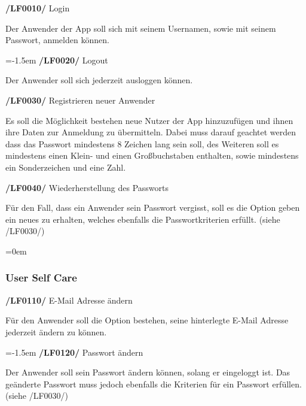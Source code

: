 \documentclass[11pt,a4paper]{report}
\begin{document}
\textbf{/LF0010/} Login
\par
\begingroup
\leftskip=1cm
\noindent Der Anwender der App soll sich mit seinem Usernamen, sowie mit seinem Passwort, anmelden können.\\
\par
\endgroup

\leftskip=-1.5em
\textbf{/LF0020/} Logout
\par
\begingroup
\leftskip=1cm
\noindent Der Anwender soll sich jederzeit ausloggen können.\\
\par
\endgroup

\textbf{/LF0030/} Registrieren neuer Anwender
\par
\begingroup
\leftskip=1cm
\noindent Es soll die Möglichkeit bestehen neue Nutzer der App hinzuzufügen und ihnen ihre Daten zur Anmeldung zu übermitteln. 
Dabei muss darauf geachtet werden dass das Passwort mindestens 8 Zeichen lang sein soll, des Weiteren soll es mindestens einen Klein- und einen Großbuchstaben enthalten, sowie mindestens ein Sonderzeichen und eine Zahl.\\
\par
\endgroup

\textbf{/LF0040/} Wiederherstellung des Passworts
\par
\begingroup
\leftskip=1cm
\noindent Für den Fall, dass ein Anwender sein Passwort vergisst, soll es die Option geben ein neues zu erhalten, welches ebenfalls die Passwortkriterien erfüllt. 
(siehe /LF0030/)\\
\par
\endgroup

\leftskip=0em
\subsubsection{User Self Care}

\textbf{/LF0110/} E-Mail Adresse ändern
\par
\begingroup
\leftskip=1cm
\noindent Für den Anwender soll die Option bestehen, seine hinterlegte E-Mail Adresse jederzeit ändern zu können.\\
\par
\endgroup

\leftskip=-1.5em
\textbf{/LF0120/} Passwort ändern
\par
\begingroup
\leftskip=1cm
\noindent Der Anwender soll sein Passwort ändern können, solang er eingeloggt ist. 
Das geänderte Passwort muss jedoch ebenfalls die Kriterien für ein Passwort erfüllen. 
(siehe /LF0030/)\\
\par
\endgroup
\end{document}
